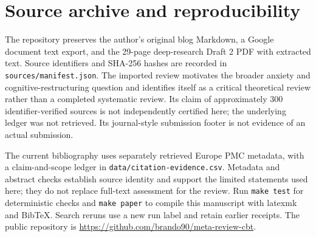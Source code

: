 \section{Source archive and reproducibility}
\label{sec:appendix}
The repository preserves the author's original blog Markdown, a Google document text export, and the 29-page deep-research Draft 2 PDF with extracted text.
Source identifiers and SHA-256 hashes are recorded in \texttt{sources/manifest.json}.
The imported review motivates the broader anxiety and cognitive-restructuring question and identifies itself as a critical theoretical review rather than a completed systematic review.
Its claim of approximately 300 identifier-verified sources is not independently certified here; the underlying ledger was not retrieved.
Its journal-style submission footer is not evidence of an actual submission.

The current bibliography uses separately retrieved Europe PMC metadata, with a claim-and-scope ledger in \texttt{data/citation-evidence.csv}.
Metadata and abstract checks establish source identity and support the limited statements used here; they do not replace full-text assessment for the review.
Run \texttt{make test} for deterministic checks and \texttt{make paper} to compile this manuscript with latexmk and BibTeX.
Search reruns use a new run label and retain earlier receipts.
The public repository is \url{https://github.com/brando90/meta-review-cbt}.
